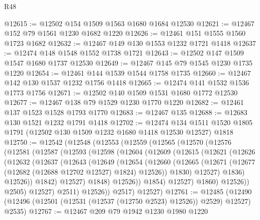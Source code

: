 \begin{lexlean}{R48}
\begin{coremodule}
@12615 := @12502 @154 @1509 @1563 @1680 @1684 @12530
@12621 := @12467 @152 @79 @1561 @1230 @1682 @1220
@12626 := @12461 @151 @1555 @1560 @1723 @1682
@12632 := @12467 @149 @130 @1553 @1232 @1721 @1418
@12637 := @12474 @148 @1548 @1552 @1738 @1721
@12643 := @12502 @147 @1509 @1547 @1680 @1737 @12530
@12649 := @12467 @145 @79 @1545 @1230 @1735 @1220
@12654 := @12461 @144 @1539 @1544 @1758 @1735
@12660 := @12467 @142 @130 @1537 @1232 @1756 @1418
@12665 := @12474 @141 @1532 @1536 @1773 @1756
@12671 := @12502 @140 @1509 @1531 @1680 @1772 @12530
@12677 := @12467 @138 @79 @1529 @1230 @1770 @1220
@12682 := @12461 @137 @1523 @1528 @1793 @1770
@12683 := @12467 @135
@12688 := @12683 @130 @1521 @1232 @1791 @1418
@12702 := @12474
    @134
    @1511
    @1520
    @1805
    @1791
    (@12502 @130 @1509 @1232 @1680 @1418 @12530 @12527)
    @1818
@12750 := @12542
    (@12548
      (@12553
        (@12559
          (@12565
            (@12570
              (@12576
                (@12581
                  (@12587
                    (@12593
                      (@12598
                        (@12604
                          (@12609
                            (@12615
                              (@12621
                                (@12626
                                  (@12632
                                    (@12637
                                      (@12643
                                        (@12649
                                          (@12654
                                            (@12660
                                              (@12665
                                                (@12671
                                                  (@12677
                                                    (@12682 (@12688 @12702 @12527) @1824)
                                                    @12526))
                                                @1830)
                                              @12527)
                                            @1836)
                                          @12526))
                                      @1842)
                                    @12527)
                                  @1848)
                                @12526))
                            @1854)
                          @12527)
                        @1860)
                      @12526))
                  @2505)
                @12527)
              @2511)
            @12526))
        @2517)
      @12527)
@12761 := @12485
    (@12490 (@12496 (@12501 (@12531 (@12537 (@12750 @2523) @12526)) @2529) @12527) @2535)
@12767 := @12467 @209 @79 @1942 @1230 @1980 @1220

\end{coremodule}
\end{lexlean}
